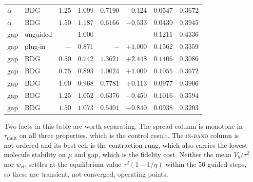 \documentclass{article}
\newcommand{\weff}{w_{\mathrm{eff}}}
\newcommand{\Vb}{V_{b}}
\newcommand{\ib}{\textsc{in-band}}
\begin{document}
\begin{table}[h]
\begin{tabular}{llrrrrrr}
$\alpha$ & BDG       & $1.25$ & $1.099$ & $0.7190$ & $-0.124$ & $0.0547$ & $0.3672$ \\
$\alpha$ & BDG       & $1.50$ & $1.187$ & $0.6166$ & $-0.533$ & $0.0430$ & $0.3945$ \\
\midrule
gap & unguided       & $-$    & $1.000$ & $-$      & $-$      & $0.1211$ & $0.4336$ \\
gap & plug-in        & $-$    & $0.871$ & $-$      & $+1.000$ & $0.1562$ & $0.3359$ \\
gap & BDG            & $0.50$ & $0.742$ & $1.3621$ & $+2.448$ & $0.1406$ & $0.3086$ \\
gap & BDG            & $0.75$ & $0.893$ & $1.0024$ & $+1.009$ & $0.1055$ & $0.3672$ \\
gap & BDG            & $1.00$ & $0.968$ & $0.7781$ & $+0.113$ & $0.0977$ & $0.3906$ \\
gap & BDG            & $1.25$ & $1.052$ & $0.6376$ & $-0.450$ & $0.1016$ & $0.3594$ \\
gap & BDG            & $1.50$ & $1.073$ & $0.5401$ & $-0.840$ & $0.0938$ & $0.3203$ \\
\bottomrule
\end{tabular}
\end{table}

Two facts in this table are worth separating. The spread column is monotone in
$\tau_{\mathrm{mult}}$ on all three properties, which is the control result. The
\ib{} column is not ordered and its best cell is the contraction rung, which also
carries the lowest molecule stability on $\mu$ and gap, which is the fidelity cost.
Neither the mean $\Vb/\tau^2$ nor $\weff$ settles at the equilibrium value
$\tau^2(1-1/\eta)$ within the 50 guided steps, so these are transient, not
converged, operating points.
\end{document}

